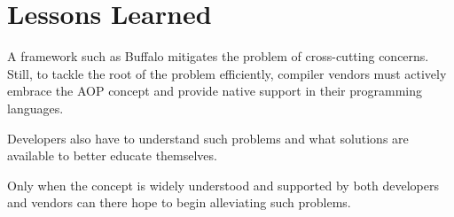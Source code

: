 \section{Lessons Learned}

A framework such as Buffalo mitigates the problem of cross-cutting concerns. Still, to tackle the root of the problem efficiently, compiler vendors must actively embrace the AOP concept and provide native support in their programming languages.

Developers also have to understand such problems and what solutions are available to better educate themselves.

Only when the concept is widely understood and supported by both developers and vendors can there hope to begin alleviating such problems.
